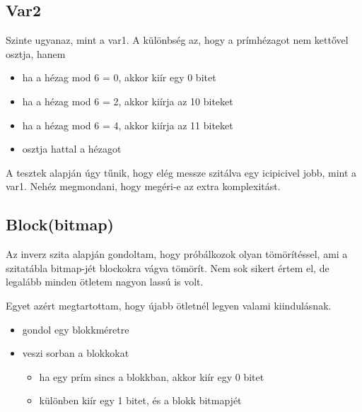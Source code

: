 \documentclass{article}
\begin{document}
\subsection{Var2}

Szinte ugyanaz, mint a var1. A különbség az, hogy a prímhézagot nem kettővel osztja, hanem
\begin{itemize}
\item ha a hézag mod 6 = 0, akkor kiír egy 0 bitet
\item ha a hézag mod 6 = 2, akkor kiírja az 10 biteket
\item ha a hézag mod 6 = 4, akkor kiírja az 11 biteket
\item osztja hattal a hézagot
\end{itemize}

A tesztek alapján úgy tűnik, hogy elég messze szitálva egy icipicivel jobb, mint a var1. Nehéz megmondani, hogy megéri-e az extra komplexitást.

\subsection{Block(bitmap)}

Az inverz szita alapján gondoltam, hogy próbálkozok olyan tömörítéssel, ami a szitatábla bitmap-jét blockokra vágva tömörít. Nem sok sikert értem el, de legalább minden ötletem nagyon lassú is volt.

Egyet azért megtartottam, hogy újabb ötletnél legyen valami kiindulásnak.

\begin{itemize}
\item gondol egy blokkméretre
\item veszi sorban a blokkokat
\begin{itemize}
\item ha egy prím sincs a blokkban, akkor kiír egy 0 bitet
\item különben kiír egy 1 bitet, és a blokk bitmapjét
\end{itemize}
\end{itemize}
\end{document}
